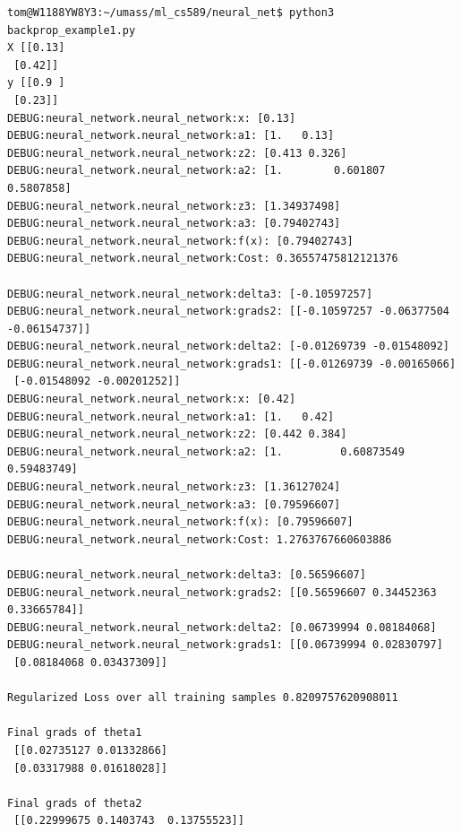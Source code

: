 \documentclass[letterpaper]{article}
\begin{document}
\begin{verbatim}
tom@W1188YW8Y3:~/umass/ml_cs589/neural_net$ python3 backprop_example1.py 
X [[0.13]
 [0.42]]
y [[0.9 ]
 [0.23]]
DEBUG:neural_network.neural_network:x: [0.13]
DEBUG:neural_network.neural_network:a1: [1.   0.13]
DEBUG:neural_network.neural_network:z2: [0.413 0.326]
DEBUG:neural_network.neural_network:a2: [1.        0.601807  0.5807858]
DEBUG:neural_network.neural_network:z3: [1.34937498]
DEBUG:neural_network.neural_network:a3: [0.79402743]
DEBUG:neural_network.neural_network:f(x): [0.79402743]
DEBUG:neural_network.neural_network:Cost: 0.36557475812121376

DEBUG:neural_network.neural_network:delta3: [-0.10597257]
DEBUG:neural_network.neural_network:grads2: [[-0.10597257 -0.06377504 -0.06154737]]
DEBUG:neural_network.neural_network:delta2: [-0.01269739 -0.01548092]
DEBUG:neural_network.neural_network:grads1: [[-0.01269739 -0.00165066]
 [-0.01548092 -0.00201252]]
DEBUG:neural_network.neural_network:x: [0.42]
DEBUG:neural_network.neural_network:a1: [1.   0.42]
DEBUG:neural_network.neural_network:z2: [0.442 0.384]
DEBUG:neural_network.neural_network:a2: [1.         0.60873549 0.59483749]
DEBUG:neural_network.neural_network:z3: [1.36127024]
DEBUG:neural_network.neural_network:a3: [0.79596607]
DEBUG:neural_network.neural_network:f(x): [0.79596607]
DEBUG:neural_network.neural_network:Cost: 1.2763767660603886

DEBUG:neural_network.neural_network:delta3: [0.56596607]
DEBUG:neural_network.neural_network:grads2: [[0.56596607 0.34452363 0.33665784]]
DEBUG:neural_network.neural_network:delta2: [0.06739994 0.08184068]
DEBUG:neural_network.neural_network:grads1: [[0.06739994 0.02830797]
 [0.08184068 0.03437309]]

Regularized Loss over all training samples 0.8209757620908011

Final grads of theta1
 [[0.02735127 0.01332866]
 [0.03317988 0.01618028]]

Final grads of theta2
 [[0.22999675 0.1403743  0.13755523]]
\end{verbatim}
\clearpage
\end{document}
